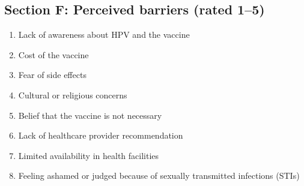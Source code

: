 \subsection*{Section F: Perceived barriers (rated 1--5)}
\begin{enumerate}[leftmargin=*,itemsep=3pt]
\item Lack of awareness about HPV and the vaccine
\item Cost of the vaccine
\item Fear of side effects
\item Cultural or religious concerns
\item Belief that the vaccine is not necessary
\item Lack of healthcare provider recommendation
\item Limited availability in health facilities
\item Feeling ashamed or judged because of sexually transmitted infections (STIs)
\end{enumerate}
